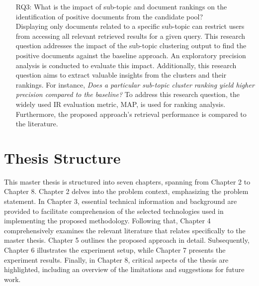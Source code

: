 \begin{enumerate}
\item[RQ3:] What is the impact of sub-topic and document rankings on the identification of positive documents from the candidate pool? \\

Displaying only documents related to a specific sub-topic can restrict users from accessing all relevant retrieved results for a given query. This research question addresses the impact of the sub-topic clustering output to find the positive documents against the baseline approach. An exploratory precision analysis is conducted to evaluate this impact. Additionally, this research question aims to extract valuable insights from the clusters and their rankings. For instance, \emph{Does a particular sub-topic cluster ranking yield higher precision compared to the baseline?} To address this research question, the widely used \ac{IR} evaluation metric, \ac{MAP}, is used for ranking analysis. Furthermore, the proposed approach's retrieval performance is compared to the literature.

\end{enumerate}


\section{Thesis Structure}

This master thesis is structured into seven chapters, spanning from Chapter 2 to Chapter 8. Chapter 2 delves into the problem context, emphasizing the problem statement. In Chapter 3, essential technical information and background are provided to facilitate comprehension of the selected technologies used in implementing the proposed methodology. Following that, Chapter 4 comprehensively examines the relevant literature that relates specifically to the master thesis. Chapter 5 outlines the proposed approach in detail. Subsequently, Chapter 6 illustrates the experiment setup, while Chapter 7 presents the experiment results. Finally, in Chapter 8, critical aspects of the thesis are highlighted, including an overview of the limitations and suggestions for future work.



